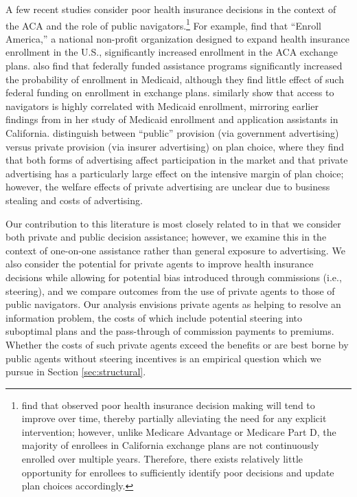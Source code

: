 \documentclass[12pt]{article}
\begin{document}
A few recent studies consider poor health insurance decisions in the context of the ACA and the role of public navigators.\footnote{\cite{ketcham2012} find that observed poor health insurance decision making will tend to improve over time, thereby partially alleviating the need for any explicit intervention; however, unlike Medicare Advantage or Medicare Part D, the majority of enrollees in California exchange plans are not continuously enrolled over multiple years. Therefore, there exists relatively little opportunity for enrollees to sufficiently identify poor decisions and update plan choices accordingly.} For example, \cite{orzol2018} find that ``Enroll America,'' a national non-profit organization designed to expand health insurance enrollment in the U.S., significantly increased enrollment in the ACA exchange plans. \cite{myerson2019} also find that federally funded assistance programs significantly increased the probability of enrollment in Medicaid, although they find little effect of such federal funding on enrollment in exchange plans. \cite{sommers2015} similarly show that access to navigators is highly correlated with Medicaid enrollment, mirroring earlier findings from \cite{aizer2003} in her study of Medicaid enrollment and application assistants in California. \cite{aizawa2025} distinguish between ``public'' provision (via government advertising) versus private provision (via insurer advertising) on plan choice, where they find that both forms of advertising affect participation in the market and that private advertising has a particularly large effect on the intensive margin of plan choice; however, the welfare effects of private advertising are unclear due to business stealing and costs of advertising.

Our contribution to this literature is most closely related to \cite{aizawa2025} in that we consider both private and public decision assistance; however, we examine this in the context of one-on-one assistance rather than general exposure to advertising. We also consider the potential for private agents to improve health insurance decisions while allowing for potential bias introduced through commissions (i.e., steering), and we compare outcomes from the use of private agents to those of public navigators. Our analysis envisions private agents as helping to resolve an information problem, the costs of which include potential steering into suboptimal plans and the pass-through of commission payments to premiums. Whether the costs of such private agents exceed the benefits or are best borne by public agents without steering incentives is an empirical question which we pursue in Section \ref{sec:structural}.
\end{document}
